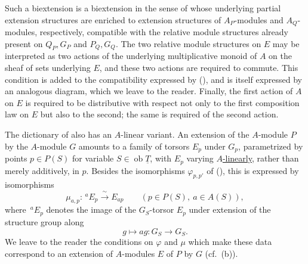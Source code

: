 Such a biextension is a biextension in the sense of  whose
underlying partial extension structures are enriched to extension
structures of $A_P$-modules and $A_Q$-modules, respectively,
compatible with the relative module structures already present on
$Q_P,G_P$ and $P_Q,G_Q$. The two relative module structures on $E$
may be interpreted as two actions of the underlying multiplicative
monoid of $A$ on the sheaf of sets underlying $E$, and these two
actions are required to commute. This condition is added to the
compatibility expressed by (), and is itself expressed by an
analogous diagram, which we leave to the reader. Finally, the first
action of $A$ on $E$ is required to be distributive with respect not
only to the first composition law on $E$ but also to the second; the
same is required of the second action.

The dictionary of  also has an $A$-linear variant. An extension
of the $A$-module $P$ by the $A$-module $G$ amounts to a family of
torsors $E_p$ under $G_p$, parametrized by points $p\in P(S)$ for
variable $S\in\operatorname{ob}\underline T$, with $E_p$ varying
\underline{$A$-linearly}, rather than merely additively, in $p$.
Besides the isomorphisms $\varphi_{p,p'}$ of (), this is
expressed by isomorphisms
\[
 \mu_{a,p}:\,{}^{a}E_p\xrightarrow{\ \sim\ }E_{ap}
 \qquad(p\in P(S),\ a\in A(S)),
\]
where $\,{}^{a}E_p$ denotes the image of the $G_S$-torsor $E_p$ under
extension of the structure group along
\[
 g\longmapsto ag:G_S\longrightarrow G_S.
\]
We leave to the reader the conditions on $\varphi$ and $\mu$ which
make these data correspond to an extension of $A$-modules $E$ of $P$
by $G$ (cf.\ (b)).

